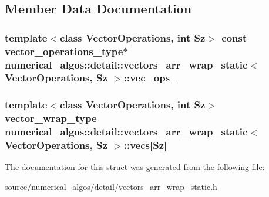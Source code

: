 \subsection{Member Data Documentation}
\hypertarget{structnumerical__algos_1_1detail_1_1vectors__arr__wrap__static_a226c7eb0e195833a9f5847811d7818ed}{
\subsubsection[{vec\-\_\-ops\-\_\-}]{\setlength{\rightskip}{0pt plus 5cm}template$<$class Vector\-Operations, int Sz$>$ const {\bf vector\-\_\-operations\-\_\-type}$\ast$ {\bf numerical\-\_\-algos\-::detail\-::vectors\-\_\-arr\-\_\-wrap\-\_\-static}$<$ Vector\-Operations, Sz $>$\-::vec\-\_\-ops\-\_\-}}\label{structnumerical__algos_1_1detail_1_1vectors__arr__wrap__static_a226c7eb0e195833a9f5847811d7818ed}
\hypertarget{structnumerical__algos_1_1detail_1_1vectors__arr__wrap__static_a3230d22931d6d730ef36cb99d6fe2c4b}{
\subsubsection[{vecs}]{\setlength{\rightskip}{0pt plus 5cm}template$<$class Vector\-Operations, int Sz$>$ {\bf vector\-\_\-wrap\-\_\-type} {\bf numerical\-\_\-algos\-::detail\-::vectors\-\_\-arr\-\_\-wrap\-\_\-static}$<$ Vector\-Operations, Sz $>$\-::vecs\mbox{[}Sz\mbox{]}}}\label{structnumerical__algos_1_1detail_1_1vectors__arr__wrap__static_a3230d22931d6d730ef36cb99d6fe2c4b}


The documentation for this struct was generated from the following file\-:\begin{DoxyCompactItemize}
\item 
source/numerical\-\_\-algos/detail/\hyperlink{vectors__arr__wrap__static_8h}{vectors\-\_\-arr\-\_\-wrap\-\_\-static.\-h}\end{DoxyCompactItemize}
